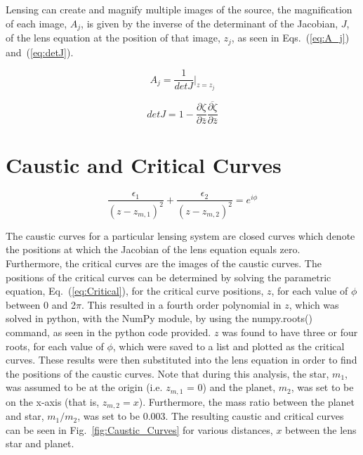 \documentclass{article}
\begin{document}
\smallskip

Lensing can create and magnify multiple images of the source, the magnification of each image, $A_j$, is given by the inverse of the determinant of the Jacobian, $J$, of the lens equation at the position of that image, $z_j$, as seen in Eqs.~(\ref{eq:A_j}) and~(\ref{eq:detJ}).

\begin{minipage}{0.45\textwidth}
\begin{equation}
A_j = \frac{1}{detJ}\Big|_{z = z_j}
\label{eq:A_j}
\end{equation}
\end{minipage}
\begin{minipage}{0.5\textwidth}
\begin{equation}
detJ = 1-\frac{\partial \zeta}{\partial \bar{z}} \overline{\frac{\partial \zeta}{\partial\bar{z}}}
\label{eq:detJ}
\end{equation}
\end{minipage}

\section{Caustic and Critical Curves}
\smallskip

\begin{equation}
\frac{\epsilon_1}{(z-z_{m,1})^2}+\frac{\epsilon_2}{(z-z_{m,2})^2}=e^{i \phi}
\label{eq:Critical}
\end{equation}

\smallskip

The caustic curves for a particular lensing system are closed curves which denote the positions at which the Jacobian of the lens equation equals zero. Furthermore, the critical curves are the images of the caustic curves. The positions of the critical curves can be determined by solving the parametric equation, Eq.~(\ref{eq:Critical}), for the critical curve positions, $z$, for each value of $\phi$ between 0 and 2$\pi$. This resulted in a fourth order polynomial in $z$, which was solved in python, with the NumPy module, by using the numpy.roots() command, as seen in the python code provided. $z$ was found to have three or four roots, for each value of $\phi$, which were saved to a list and plotted as the critical curves. These results were then substituted into the lens equation in order to find the positions of the caustic curves. Note that during this analysis, the star, $m_1$, was assumed to be at the origin (i.e. $z_{m,1}$ = 0) and the planet, $m_2$, was set to be on the x-axis (that is, $z_{m,2}=x$). Furthermore, the mass ratio between the planet and star, $m_1/m_2$, was set to be 0.003. The resulting caustic and critical curves can be seen in Fig.~\ref{fig:Caustic_Curves} for various distances, $x$ between the lens star and planet.
\end{document}
